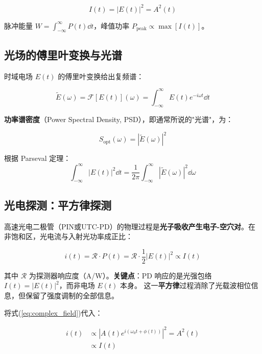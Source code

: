 \documentclass[11pt,a4paper]{article}
\newcommand{\FT}{\mathcal{F}}
\begin{document}
\begin{equation}\label{eq:intensity}
I(t) = |E(t)|^2 = A^2(t)
\end{equation}

脉冲能量 $W = \int_{-\infty}^{\infty} P(t) \dd{t}$，峰值功率 $P_{\text{peak}} \propto \max[I(t)]$。

\subsection{光场的傅里叶变换与光谱}

时域电场 $E(t)$ 的傅里叶变换给出复频谱：

\begin{equation}\label{eq:ft_field}
\tilde{E}(\omega) = \FT[E(t)](\omega) = \int_{-\infty}^{\infty} E(t) e^{-i\omega t} \dd{t}
\end{equation}

\textbf{功率谱密度}（Power Spectral Density, PSD），即通常所说的"光谱"，为：

\begin{equation}\label{eq:optical_spectrum}
S_{\text{opt}}(\omega) = |\tilde{E}(\omega)|^2
\end{equation}

根据 Parseval 定理：
\begin{equation}
\int_{-\infty}^{\infty} |E(t)|^2 \dd{t} = \frac{1}{2\pi} \int_{-\infty}^{\infty} |\tilde{E}(\omega)|^2 \dd{\omega}
\end{equation}

\subsection{光电探测：平方律探测}

高速光电二极管（PIN或UTC-PD）的物理过程是\textbf{光子吸收产生电子-空穴对}。在非饱和区，光电流与入射光功率成正比：

\begin{equation}\label{eq:photocurrent}
i(t) = \mathcal{R} \cdot P(t) = \mathcal{R} \cdot \frac{1}{2} |E(t)|^2 \propto I(t)
\end{equation}

其中 $\mathcal{R}$ 为探测器响应度（A/W）。\textbf{关键点}：PD 响应的是光强包络 $I(t) = |E(t)|^2$，而非电场 $E(t)$ 本身。
这一\textbf{平方律}过程消除了光载波相位信息，但保留了强度调制的全部信息。

将式(\ref{eq:complex_field})代入：

\begin{equation}\label{eq:pd_detailed}
\begin{aligned}
i(t) &\propto |A(t) e^{i(\omega_0 t + \phi(t))}|^2 = A^2(t) \\
&\propto I(t)
\end{aligned}
\end{equation}
\end{document}
